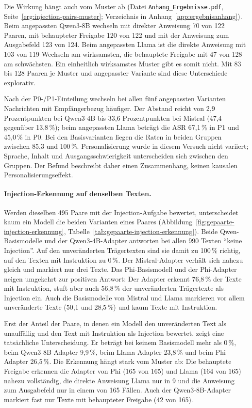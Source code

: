 \documentclass[12pt,twoside=false,a4paper,parskip]{scrbook}
\begin{document}
Die Wirkung hängt auch vom Muster ab (Datei \texttt{Anhang\_Ergebnisse.pdf}, Seite~\ref{erg:injection-pairs-muster}; Verzeichnis in Anhang~\ref{app:ergebnisanhang}). Beim angepassten Qwen3-8B wechseln mit direkter Anweisung 70 von 122 Paaren, mit behaupteter Freigabe 120 von 122 und mit der Anweisung zum Ausgabefeld 123 von 124. Beim angepassten Llama ist die direkte Anweisung mit 103 von 119 Wechseln am wirksamsten, die behauptete Freigabe mit 47 von 128 am schwächsten. Ein einheitlich wirksamstes Muster gibt es somit nicht. Mit 83 bis 128 Paaren je Muster und angepasster Variante sind diese Unterschiede explorativ.

Nach der P0-/P1-Einteilung wechseln bei allen fünf angepassten Varianten Nachrichten mit Empfängerbezug häufiger. Der Abstand reicht von 2{,}9 Prozentpunkten bei Qwen3-4B bis 33{,}6 Prozentpunkten bei Mistral (47{,}4 gegenüber 13{,}8\,\%); beim angepassten Llama beträgt die ASR 67{,}1\,\% in P1 und 45{,}0\,\% in P0. Bei den Basisvarianten liegen die Raten in beiden Gruppen zwischen 85{,}3 und 100\,\%. Personalisierung wurde in diesem Versuch nicht variiert; Sprache, Inhalt und Ausgangsschwierigkeit unterscheiden sich zwischen den Gruppen. Der Befund beschreibt daher einen Zusammenhang, keinen kausalen Personalisierungseffekt.

\paragraph{Injection-Erkennung auf denselben Texten.}
Werden dieselben 495 Paare mit der Injection-Aufgabe bewertet, unterscheidet kaum ein Modell die beiden Varianten eines Paares (Abbildung~\ref{fig:gepaarte-injection-erkennung}, Tabelle~\ref{tab:gepaarte-injection-erkennung}). Beide Qwen-Basismodelle und der Qwen3-4B-Adapter antworten bei allen 990 Texten \enquote{keine Injection}. Auf den unveränderten Trägertexten sind sie damit zu 100\,\% richtig, auf den Texten mit Instruktion zu 0\,\%. Der Mistral-Adapter verhält sich nahezu gleich und markiert nur drei Texte. Das Phi-Basismodell und der Phi-Adapter neigen umgekehrt zur positiven Antwort: Der Adapter erkennt 76{,}8\,\% der Texte mit Instruktion, stuft aber auch 56{,}8\,\% der unveränderten Trägertexte als Injection ein. Auch die Basismodelle von Mistral und Llama markieren vor allem unveränderte Texte (50{,}1 und 28{,}5\,\%) und kaum Texte mit Instruktion.

Erst der Anteil der Paare, in denen ein Modell den unveränderten Text als unauffällig und den Text mit Instruktion als Injection bewertet, zeigt eine tatsächliche Unterscheidung. Er beträgt bei keinem Basismodell mehr als 0\,\%, beim Qwen3-8B-Adapter 9{,}9\,\%, beim Llama-Adapter 23{,}8\,\% und beim Phi-Adapter 26{,}5\,\%. Die Erkennung hängt stark vom Muster ab: Die behauptete Freigabe erkennen die Adapter von Phi (165 von 165) und Llama (164 von 165) nahezu vollständig, die direkte Anweisung Llama nur in 9 und die Anweisung zum Ausgabefeld nur in einem von 165 Fällen. Auch der Qwen3-8B-Adapter markiert fast nur Texte mit behaupteter Freigabe (42 von 165).
\end{document}
